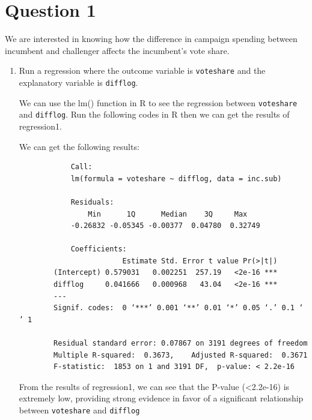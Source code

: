 \documentclass[12pt,letterpaper]{article}
\begin{document}
\section*{Question 1}
\vspace{.25cm}
\noindent We are interested in knowing how the difference in campaign spending between incumbent and challenger affects the incumbent's vote share. 
	\begin{enumerate}
		\item Run a regression where the outcome variable is \texttt{voteshare} and the explanatory variable is \texttt{difflog}.	\vspace{.15cm}
		
	   \noindent  We can use the lm() function in R to see the regression between \texttt{voteshare} and \texttt{difflog}. Run the following codes in R then we can get the results of regression1.\\	\vspace{.15cm}
		
		
		
		\noindent We can get the following results:\\ \vspace{.15cm}
		\begin{verbatim}
			Call:
			lm(formula = voteshare ~ difflog, data = inc.sub)
			
			Residuals:     
			   	Min      1Q      Median    3Q     Max 
			-0.26832 -0.05345 -0.00377  0.04780  0.32749 
			
			Coefficients:
			            Estimate Std. Error t value Pr(>|t|)    
		(Intercept) 0.579031   0.002251  257.19   <2e-16 ***
		difflog     0.041666   0.000968   43.04   <2e-16 ***
		---
		Signif. codes:  0 ‘***’ 0.001 ‘**’ 0.01 ‘*’ 0.05 ‘.’ 0.1 ‘ ’ 1
		
		Residual standard error: 0.07867 on 3191 degrees of freedom
		Multiple R-squared:  0.3673,	Adjusted R-squared:  0.3671 
		F-statistic:  1853 on 1 and 3191 DF,  p-value: < 2.2e-16
		\end{verbatim}
		\vspace{.5cm}
		
		\noindent From the results of regression1, we can see that the P-value (\textless 2.2e-16) is extremely low, providing strong evidence in favor of a significant relationship between \texttt{voteshare} and \texttt{difflog}\\ \vspace{.15cm}
		

\end{enumerate}
\end{document}
